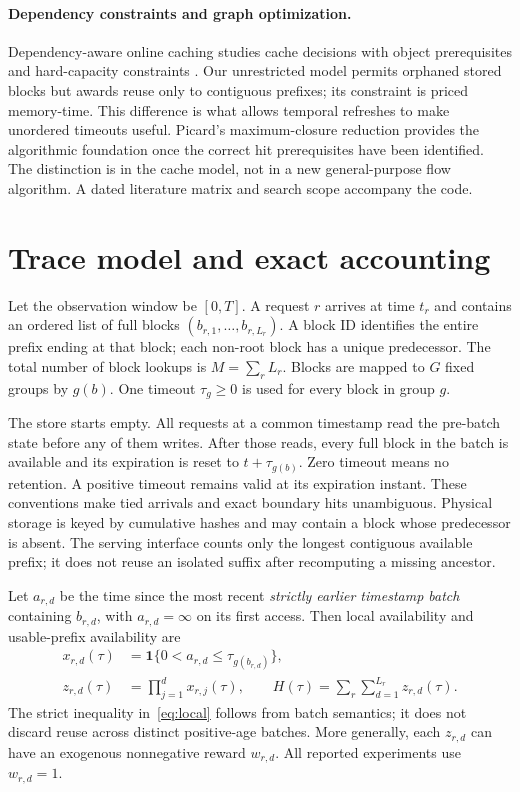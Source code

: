 \documentclass[11pt,a4paper]{article}
\newcommand{\ind}{\mathbf{1}}
\begin{document}
\paragraph{Dependency constraints and graph optimization.}
Dependency-aware online caching studies cache decisions with object prerequisites
and hard-capacity constraints \cite{dependency}. Our unrestricted model permits
orphaned stored blocks but awards reuse only to contiguous prefixes; its constraint
is priced memory-time. This difference is what allows temporal refreshes to make
unordered timeouts useful. Picard's maximum-closure reduction \cite{picard}
provides the algorithmic foundation once the correct hit prerequisites have been
identified. The distinction is in the cache model, not in a new general-purpose
flow algorithm. A dated literature matrix and search scope accompany the code.

\section{Trace model and exact accounting}\label{sec:model}
Let the observation window be $[0,T]$. A request $r$ arrives at time $t_r$ and
contains an ordered list of full blocks $(b_{r,1},\ldots,b_{r,L_r})$. A block ID
identifies the entire prefix ending at that block; each non-root block has a
unique predecessor. The total number of block lookups is
$M=\sum_r L_r$. Blocks are mapped to $G$ fixed groups by $g(b)$. One timeout
$\tau_g\geq0$ is used for every block in group $g$.

The store starts empty. All requests at a common timestamp read the pre-batch
state before any of them writes. After those reads, every full block in the batch
is available and its expiration is reset to $t+\tau_{g(b)}$. Zero timeout means
no retention. A positive timeout remains valid at its expiration instant. These
conventions make tied arrivals and exact boundary hits unambiguous. Physical
storage is keyed by cumulative hashes and may contain a block whose predecessor
is absent. The serving interface counts only the longest contiguous available
prefix; it does not reuse an isolated suffix after recomputing a missing ancestor.

Let $a_{r,d}$ be the time since the most recent \emph{strictly earlier timestamp
batch} containing $b_{r,d}$, with $a_{r,d}=\infty$ on its first access. Then local
availability and usable-prefix availability are
\begin{align}
 x_{r,d}(\tau)&=\ind\{0<a_{r,d}\leq\tau_{g(b_{r,d})}\},\label{eq:local}\\
 z_{r,d}(\tau)&=\prod_{j=1}^{d}x_{r,j}(\tau),\qquad
 H(\tau)=\sum_r\sum_{d=1}^{L_r}z_{r,d}(\tau).\label{eq:hit}
\end{align}
The strict inequality in~\eqref{eq:local} follows from batch semantics; it does
not discard reuse across distinct positive-age batches. More generally, each
$z_{r,d}$ can have an exogenous nonnegative reward $w_{r,d}$. All reported
experiments use $w_{r,d}=1$.
\end{document}

